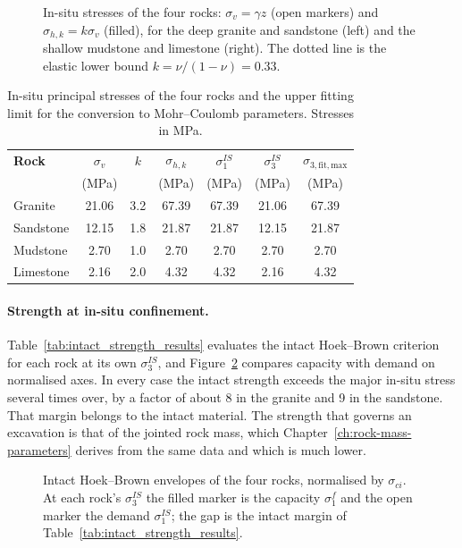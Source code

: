 \begin{figure}[htbp]
\centering
{}
\caption{In-situ stresses of the four rocks: $\sigma_v = \gamma z$ (open markers) and $\sigma_{h,k} = k\sigma_v$ (filled), for the deep granite and sandstone (left) and the shallow mudstone and limestone (right). The dotted line is the elastic lower bound $k = \nu/(1-\nu) = 0.33$.}
\label{fig:insitu-stress-depth}
\end{figure}

\begin{table}[htbp]
\caption{In-situ principal stresses of the four rocks and the upper fitting limit for the conversion to Mohr--Coulomb parameters. Stresses in MPa.}
\label{tab:insitu_stress_fitting}
\centering
\small
\begin{tabular}{l c c c c c c}
\toprule
\textbf{Rock} & \(\sigma_v\) & \(k\) & \(\sigma_{h,k}\) & \(\sigma_1^{IS}\) & \(\sigma_3^{IS}\) & \(\sigma_{3,\mathrm{fit,max}}\) \\
 & (MPa) & & (MPa) & (MPa) & (MPa) & (MPa) \\
\midrule
Granite & 21.06 & 3.2 & 67.39 & 67.39 & 21.06 & 67.39 \\
Sandstone & 12.15 & 1.8 & 21.87 & 21.87 & 12.15 & 21.87 \\
Mudstone & 2.70 & 1.0 & 2.70 & 2.70 & 2.70 & 2.70 \\
Limestone & 2.16 & 2.0 & 4.32 & 4.32 & 2.16 & 4.32 \\
\bottomrule
\end{tabular}
\end{table}

\paragraph{Strength at in-situ confinement.}
Table~\ref{tab:intact_strength_results} evaluates the intact Hoek--Brown
criterion for each rock at its own \(\sigma_3^{IS}\), and
Figure~\ref{fig:hb-intact-four-rocks} compares capacity with demand on
normalised axes. In every case the
intact strength exceeds the major in-situ stress several times over, by a
factor of about 8 in the granite and 9 in the sandstone. That margin belongs
to the intact material. The strength that governs an excavation is that of
the jointed rock mass, which Chapter~\ref{ch:rock-mass-parameters} derives
from the same data and which is much lower.

\begin{figure}[htbp]
\centering
{}
\caption{Intact Hoek--Brown envelopes of the four rocks, normalised by $\sigma_{ci}$. At each rock's $\sigma_3^{IS}$ the filled marker is the capacity $\sigma_1^f$ and the open marker the demand $\sigma_1^{IS}$; the gap is the intact margin of Table~\ref{tab:intact_strength_results}.}
\label{fig:hb-intact-four-rocks}
\end{figure}

